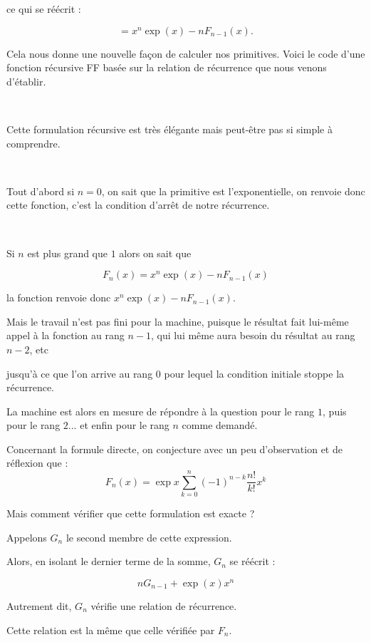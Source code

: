 \change
    \begin{center}
      ce qui se réécrit : 
    \end{center}
$$= x^n\exp(x) - n F_{n-1}(x).$$
  
  
\change
Cela nous donne une nouvelle façon de calculer nos primitives.
Voici le code d'une fonction récursive FF basée sur la relation de récurrence que nous venons d'établir.

~

Cette formulation récursive est très élégante mais peut-être pas si simple à comprendre.

~

Tout d'abord si $n=0$, on sait que la primitive est l'exponentielle, on renvoie donc cette fonction, c'est la condition d'arrêt de notre récurrence.

~

Si $n$ est plus grand que $1$ alors on sait que 

$$F_n(x) = x^n \exp(x) - nF_{n-1}(x)$$

la fonction renvoie donc $x^n \exp(x) - nF_{n-1}(x)$.

Mais le travail n'est pas fini pour la machine, puisque le résultat fait lui-même
appel à la fonction au rang $n-1$, qui lui même aura besoin du résultat au rang $n-2$, etc

jusqu'à ce que l'on arrive au rang $0$ pour lequel la condition initiale stoppe la récurrence. 

La machine est alors en mesure de répondre à la question pour le rang $1$, puis pour le rang $2$... et enfin pour le rang $n$ comme demandé.


\diapo
Concernant la formule directe, on conjecture avec un peu d'observation et de réflexion que : 
  $$F_n(x) = \exp x \sum_{k=0}^n (-1)^{n-k} \frac{n!}{k!} x^k$$

Mais comment vérifier que cette formulation est exacte ?

\change
Appelons $G_n$ le second membre de cette expression.

\change
Alors, en isolant le dernier terme de la somme, $G_n$ se réécrit :

\change
$$n G_{n-1} + \exp(x)x^n$$

\change
Autrement dit, $G_n$ vérifie une relation de récurrence.

Cette relation est la même que celle vérifiée par $F_n$.

    
